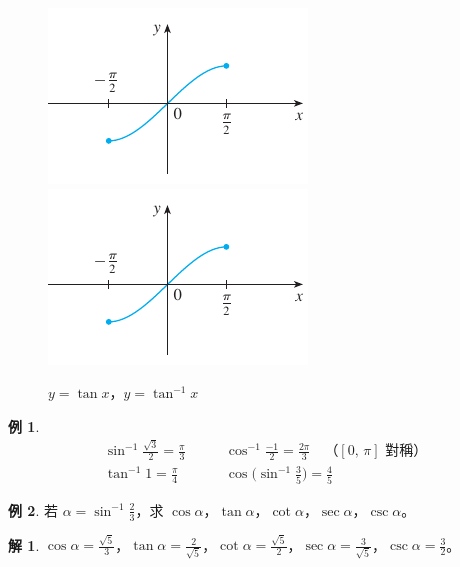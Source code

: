 \documentclass[12pt]{extarticle}
\newcommand{\ds}{\displaystyle}
\theoremstyle{definition}
\newtheorem*{ex}{例}
\newtheorem*{sol}{解}
\begin{document}
\vspace{-1cm}
\begin{figure}[!htbp]
  \centering
  \includegraphics[scale=1.2,page=5]{fig/trig.pdf}
  \includegraphics[scale=1.2,page=6]{fig/trig.pdf}
  \caption{$y = \tan x$，$y = \tan^{-1} x$}
\end{figure}

\newpage

\begin{ex} 
  \begin{align*}
    &\sin^{-1}\frac{\sqrt{3}}{2} = \frac{\pi}{3}\qquad &\cos^{-1}\frac{-1}{2} = \frac{2\pi}{3}\quad\text{（$[0,\,\pi]$ 對稱）}\\
    &\tan^{-1}1 = \frac{\pi}{4}\qquad&\cos\big(\sin^{-1}\frac{3}{5}\big) = \frac{4}{5}\qquad\qquad
  \end{align*}
\end{ex}

\begin{ex}
  若 $\ds\alpha = \sin^{-1}\frac{2}{3}$，求 $\cos\alpha$，$\tan\alpha$，$\cot\alpha$，$\sec\alpha$，$\csc\alpha$。
\end{ex}

\begin{sol}
  $\ds\cos\alpha = \frac{\sqrt{5}}{3}$，$\ds\tan\alpha = \frac{2}{\sqrt{5}}$，$\ds\cot\alpha = \frac{\sqrt{5}}{2}$，$\ds\sec\alpha = \frac{3}{\sqrt{5}}$，$\ds\csc\alpha = \frac{3}{2}$。
\end{sol}
\end{document}
